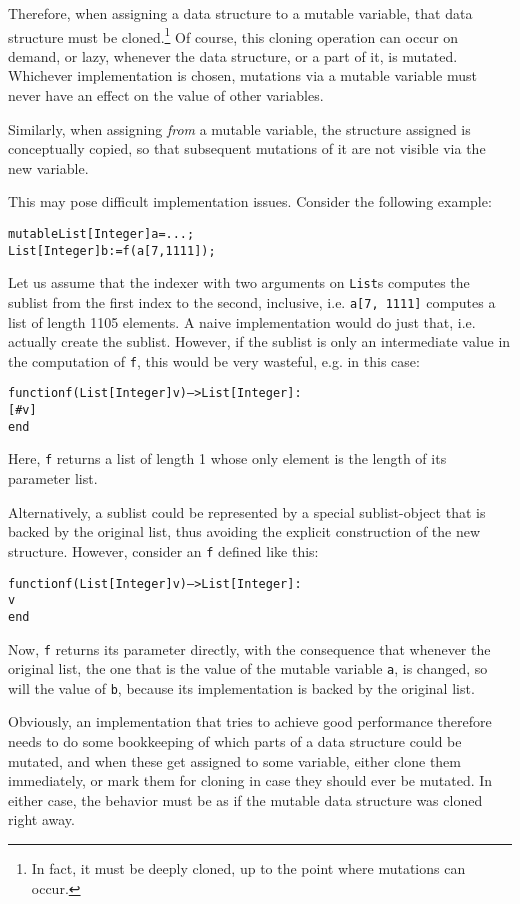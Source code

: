 Therefore, when assigning a data structure to a
mutable variable, that data structure must be cloned.\footnote{In
  fact, it must be deeply cloned, up to the point where mutations can
  occur.} Of course, this cloning operation can occur on demand, or
lazy, whenever the data structure, or a part of it, is mutated.
Whichever implementation is chosen, mutations
via a mutable variable must never have an effect on the value of other
variables.

Similarly, when assigning {\em from} a mutable variable, the structure
assigned is conceptually copied, so that subsequent mutations of it
are not visible via the new variable. 

\begin{implementation}
  This may pose difficult implementation issues. Consider the
  following example:

\begin{alltt}mutable List[Integer] a = ...;
List[Integer] b := f(a[7, 1111]);
\end{alltt}

Let us assume that the indexer with two arguments on {\tt List}s
computes the sublist from the first index to the second,
inclusive, i.e. {\tt a[7, 1111]} computes a list of length 1105
elements. A naive implementation would do just that, i.e. actually
create the sublist. However, if the sublist is only an intermediate
value in the computation of {\tt f}, this would be very wasteful,
e.g. in this case:
\begin{alltt}function f(List[Integer] v)-->List[Integer] :
    [#v]
end
\end{alltt}
Here, {\tt f} returns a list of length 1 whose only element is the
length of its parameter list.

Alternatively, a sublist could be represented by a special sublist-object that
is backed by the original list, thus avoiding the explicit
construction of the new structure. However, consider an {\tt f} defined like
this:
\begin{alltt}function f(List[Integer] v)-->List[Integer] :
    v
end
\end{alltt}
Now, {\tt f} returns its parameter directly, with the consequence that
whenever the original list, the one that is the value of the mutable
variable {\tt a}, is changed, so will the value of {\tt b}, because
its implementation is backed by the original list.

Obviously, an implementation that tries to achieve good performance
therefore needs to do some bookkeeping of which parts of a data
structure could be mutated, and when these get assigned to some
variable, either clone them immediately, or mark them for cloning in
case they should ever be mutated. In either case, the behavior must be
as if the mutable data structure was cloned right away.
\end{implementation}


